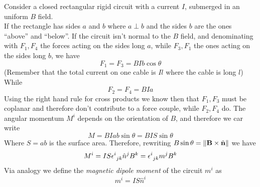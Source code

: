 \documentclass[../electromagnetism]{subfiles}
\begin{document}
\begin{eg}
	Consider a closed rectangular rigid circuit with a current $I$, submerged in an uniform $B$ field.\\
	If the rectangle has sides $a$ and $b$ where $a\perp b$ and the sides $b$ are the ones ``above'' and ``below''. If the circuit isn't normal to the $B$ field, and denominating with $F_1,F_4$ the forces acting on the sides long $a$, while $F_3,F_1$ the ones acting on the sides long $b$, we have
	\begin{equation*}
		F_1=F_3=BIb\cos\theta
	\end{equation*}
	(Remember that the total current on one cable is $Il$ where the cable is long $l$)\\
	While
	\begin{equation*}
		F_2=F_4=BIa
	\end{equation*}
	Using the right hand rule for cross products we know then that $F_1,F_3$ must be coplanar and therefore don't contribute to a force couple, while $F_2,F_4$ do. The angular momentum $M^i$ depends on the orientation of $B$, and therefore we car write
	\begin{equation*}
		M=BIab\sin\theta=BIS\sin\theta
	\end{equation*}
	Where $S=ab$ is the surface area. Therefore, rewriting $B\sin\theta=\norm{\mathbf{B}\times\hat{\mathbf{n}}}$ we have
	\begin{equation*}
		M^i=IS\epsilon^{i}_{\ jk}\hat{n}^jB^k=\epsilon^{i}_{\ jk}m^jB^k
	\end{equation*}
	Via analogy we define the \textit{magnetic dipole moment} of the circuit $m^i$ as
	\begin{equation}
		m^i=IS\hat{n}^i
		\label{eq:magdipmomcirc}
	\end{equation}
\end{eg}
\end{document}
